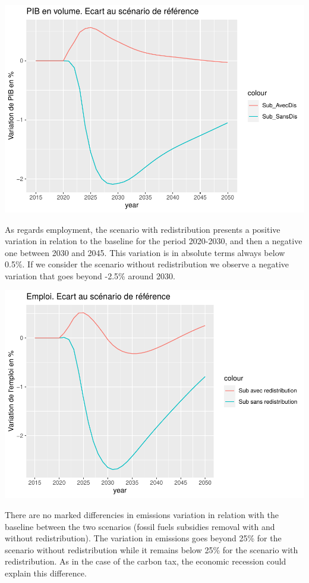 \documentclass[
]{article}
\begin{document}
\begin{center}\includegraphics[width=0.7\linewidth,height=0.7\textheight]{Modele-ThreeMe-Tunisie_Sequeira_Valilou_Wang_files/figure-latex/unnamed-chunk-11-1} \end{center}

As regards employment, the scenario with redistribution presents a
positive variation in relation to the baseline for the period 2020-2030,
and then a negative one between 2030 and 2045. This variation is in
absolute terms always below 0.5\%. If we consider the scenario without
redistribution we observe a negative variation that goes beyond -2.5\%
around 2030.

\begin{center}\includegraphics[width=0.7\linewidth,height=0.7\textheight]{Modele-ThreeMe-Tunisie_Sequeira_Valilou_Wang_files/figure-latex/unnamed-chunk-12-1} \end{center}

There are no marked differencies in emissions variation in relation with
the baseline between the two scenarios (fossil fuels subsidies removal
with and without redistribution). The variation in emissions goes beyond
25\% for the scenario without redistribution while it remains below 25\%
for the scenario with redistribution. As in the case of the carbon tax,
the economic recession could explain this difference.
\end{document}
